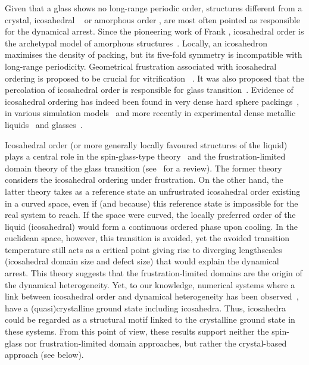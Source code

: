 Given that a glass shows no long-range periodic order, structures different from a crystal, icosahedral  ~\cite{steinhardt1983boo,sadoc1999geometrical, tarjus2005fba} or amorphous order \cite{lubchenko2007}, are most often pointed as responsible for the dynamical arrest. Since the pioneering work of Frank \cite{Frank1952}, icosahedral order is the archetypal model of amorphous structures~\citep{Spaepen2000}. Locally, an icosahedron maximises the density of packing, but its five-fold symmetry is incompatible with long-range periodicity. Geometrical frustration associated with icosahedral ordering is proposed to be crucial for vitrification ~\cite{steinhardt1983boo,sadoc1999geometrical, tarjus2005fba}. It was also proposed that the percolation of icosahedral order is responsible for glass transition~\cite{Tomida1995}.  Evidence of icosahedral ordering has indeed been found in very dense hard sphere packings~\citep{Bernal1960, Clarke1993, Anikeenko2007, Malshe2011, Charbonneau}, in various simulation models~\citep{steinhardt1983boo, Tomida1995, Doye2003, Pedersen2010, Coslovich2011} and more recently in experimental dense metallic liquids~\citep{Reichert2000, Celino2007} and glasses~\citep{Luo2004, Wang2011}.

Icosahedral order (or more generally locally favoured structures of the liquid) plays a central role in the spin-glass-type theory~\cite{steinhardt1983boo} and the frustration-limited domain theory of the glass transition (see~\citep{tarjus2005fba} for a review). The former theory considers the icosahedral ordering under frustration. On the other hand, the latter theory takes as a reference state an unfrustrated icosahedral order existing in a curved space, even if (and because) this reference state is impossible for the real system to reach. If the space were curved, the locally preferred order of the liquid (icosahedral) would form a continuous ordered phase upon cooling. In the  euclidean space, however, this transition is avoided, yet the avoided transition temperature still acts as a critical point giving rise to diverging lengthscales (icosahedral domain size and defect size) that would explain the dynamical arrest. This theory suggests that the frustration-limited domains are the origin of the dynamical heterogeneity. Yet, to our knowledge, numerical systems where a link between icosahedral order and dynamical heterogeneity has been observed~\citep{Doye2003, Pedersen2010, Coslovich2011}, have a (quasi)crystalline ground state including icosahedra. Thus, icosahedra could be regarded as a structural motif linked to the crystalline ground state in these systems. From this point of view, these results support neither the spin-glass nor frustration-limited domain approaches, but rather the crystal-based approach (see below).

